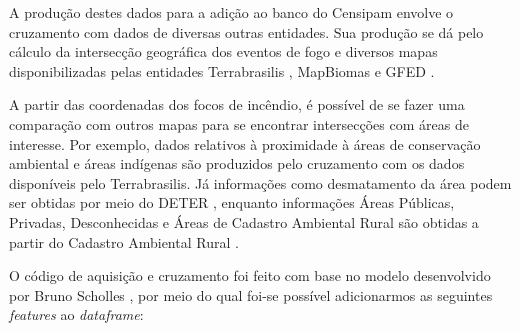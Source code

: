 A produção destes dados para a adição ao banco do Censipam envolve o cruzamento com dados de diversas outras entidades. Sua produção se dá pelo cálculo da intersecção geográfica dos eventos de fogo e diversos mapas disponibilizadas pelas entidades Terrabrasilis \cite{terrabrasilis}, MapBiomas \cite{MapBiomasQueimadas} e GFED \cite{gfed}.

A partir das coordenadas dos focos de incêndio, é possível de se fazer uma comparação com outros mapas para se encontrar intersecções com áreas de interesse. Por exemplo, dados relativos à proximidade à áreas de conservação ambiental e áreas indígenas são produzidos pelo cruzamento com os dados disponíveis pelo Terrabrasilis. Já informações como desmatamento da área podem ser obtidas por meio do DETER \cite{deter}, enquanto informações Áreas Públicas, Privadas, Desconhecidas e Áreas de Cadastro Ambiental Rural são obtidas a partir do Cadastro Ambiental Rural \cite{cadastro-rural}.

 O código de aquisição e cruzamento foi feito com base no modelo desenvolvido por Bruno Scholles \cite{BrunoScholess2023}, por meio do qual foi-se possível adicionarmos as seguintes \textit{features} ao \textit{dataframe}:


